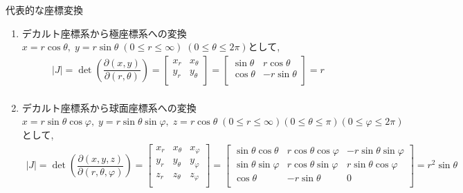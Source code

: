 \documentclass[a4paper]{jsarticle}
\begin{document}
\begin{itembox}[l]{代表的な座標変換}
    \begin{enumerate}[(1)]
        \item デカルト座標系から極座標系への変換\\
              $x=r\cos\theta,\; y=r\sin\theta\;\left(0\leq r\leq \infty\right)\;\left(0\leq \theta \leq 2\pi\right)$として,
              \begin{eqnarray*}
                  |J|=
                  \det\left(\dfrac{\partial\left(x,y\right)}{\partial\left(r,\theta\right)}\right)
                  =
                  \begin{bmatrix}
                      x_r & x_\theta \\
                      y_r & y_\theta \\
                  \end{bmatrix}
                  =
                  \begin{bmatrix}
                      \sin\theta & r\cos\theta  \\
                      \cos\theta & -r\sin\theta \\
                  \end{bmatrix}
                  =r\\
              \end{eqnarray*}
        \item デカルト座標系から球面座標系への変換\\
              $x=r\sin\theta\cos\varphi,\; y=r\sin\theta\sin\varphi,\; z=r\cos\theta\;\left(0\leq r\leq\infty\right)\left(0\leq\theta\leq\pi\right)\left(0\leq\varphi\leq 2\pi\right)$として,
              \begin{eqnarray*}
                  |J|
                  =
                  \det\left(\dfrac{\partial \left(x,y,z\right)}{\partial \left(r,\theta,\varphi\right)}\right)
                  =
                  \begin{bmatrix}
                      x_r & x_\theta & x_\varphi \\
                      y_r & y_\theta & y_\varphi \\
                      z_r & z_\theta & z_\varphi \\
                  \end{bmatrix}
                  =
                  \begin{bmatrix}
                      \sin\theta\cos\theta  & r\cos\theta\cos\varphi & -r\sin\theta\sin\varphi \\
                      \sin\theta\sin\varphi & r\cos\theta\sin\varphi & r\sin\theta\cos\varphi  \\
                      \cos\theta            & -r\sin\theta           & 0                       \\
                  \end{bmatrix}
                  =r^2\sin\theta
              \end{eqnarray*}
    \end{enumerate}
\end{itembox}
\end{document}
